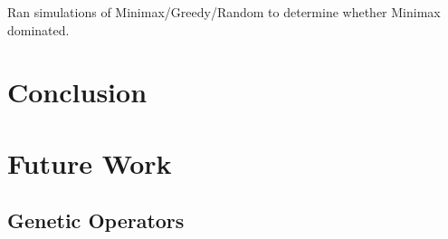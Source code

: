\documentclass{acm_proc_article-sp}
\begin{document}
        Ran simulations of Minimax/Greedy/Random to determine whether Minimax dominated.

\section{Conclusion}

    
\section{Future Work}

    \subsection{Genetic Operators}


%


\begin{thebibliography}{1}


\end{thebibliography}


\balancecolumns
\end{document}
